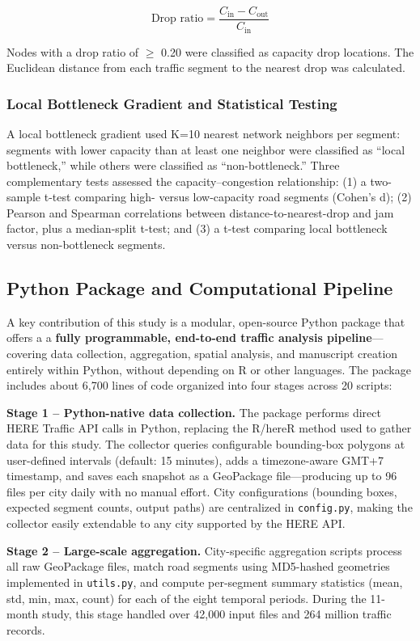 \documentclass[12pt,a4paper]{article}
\begin{document}
\[\text{Drop ratio} = \frac{C_{\text{in}} - C_{\text{out}}}{C_{\text{in}}}\]

Nodes with a drop ratio of  $\geq$ 0.20 were classified as capacity drop locations. The Euclidean distance from each traffic segment to the nearest drop was calculated.

\subsubsection{Local Bottleneck Gradient and Statistical Testing}

A local bottleneck gradient used K=10 nearest network neighbors per segment: segments with lower capacity than at least one neighbor were classified as “local bottleneck,” while others were classified as “non-bottleneck.” Three complementary tests assessed the capacity–congestion relationship: (1) a two-sample t-test comparing high- versus low-capacity road segments (Cohen’s d); (2) Pearson and Spearman correlations between distance-to-nearest-drop and jam factor, plus a median-split t-test; and (3) a t-test comparing local bottleneck versus non-bottleneck segments.

\subsection{Python Package and Computational Pipeline}

A key contribution of this study is a modular, open-source Python package that offers a  a \textbf{fully programmable, end-to-end traffic analysis pipeline}---covering data collection, aggregation, spatial analysis, and manuscript creation entirely within Python, without depending on R or other languages. The package includes about 6,700 lines of code organized into four stages across 20 scripts:

\textbf{Stage 1 -- Python-native data collection.} The package performs direct HERE Traffic API calls in Python, replacing the R/hereR method used to gather data for this study. The collector queries configurable bounding-box polygons at user-defined intervals (default: 15 minutes), adds a timezone-aware GMT+7 timestamp, and saves each snapshot as a GeoPackage file—producing up to 96 files per city daily with no manual effort. City configurations (bounding boxes, expected segment counts, output paths) are centralized in  \texttt{config.py}, making the collector easily extendable to any city supported by the HERE API.

\textbf{Stage 2 -- Large-scale aggregation.} City-specific aggregation scripts process all raw GeoPackage files, match road segments using MD5-hashed geometries implemented in \texttt{utils.py}, and compute per-segment summary statistics (mean, std, min, max, count) for each of the eight temporal periods. During the 11-month study, this stage handled over 42,000 input files and 264 million traffic records.
\end{document}
